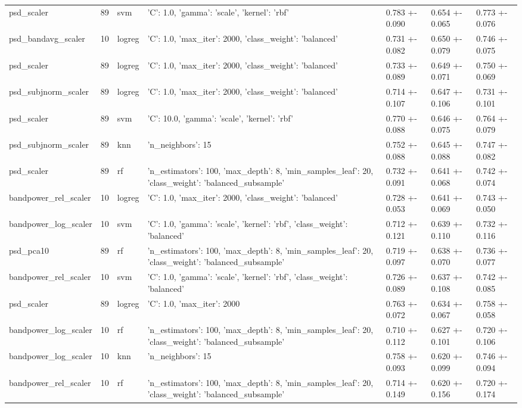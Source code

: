 \begin{longtable}{lrlllll}
psd_scaler & 89 & svm & {'C': 1.0, 'gamma': 'scale', 'kernel': 'rbf'} & 0.783 +- 0.090 & 0.654 +- 0.065 & 0.773 +- 0.076 \\
psd_bandavg_scaler & 10 & logreg & {'C': 1.0, 'max_iter': 2000, 'class_weight': 'balanced'} & 0.731 +- 0.082 & 0.650 +- 0.079 & 0.746 +- 0.075 \\
psd_scaler & 89 & logreg & {'C': 1.0, 'max_iter': 2000, 'class_weight': 'balanced'} & 0.733 +- 0.089 & 0.649 +- 0.071 & 0.750 +- 0.069 \\
psd_subjnorm_scaler & 89 & logreg & {'C': 1.0, 'max_iter': 2000, 'class_weight': 'balanced'} & 0.714 +- 0.107 & 0.647 +- 0.106 & 0.731 +- 0.101 \\
psd_scaler & 89 & svm & {'C': 10.0, 'gamma': 'scale', 'kernel': 'rbf'} & 0.770 +- 0.088 & 0.646 +- 0.075 & 0.764 +- 0.079 \\
psd_subjnorm_scaler & 89 & knn & {'n_neighbors': 15} & 0.752 +- 0.088 & 0.645 +- 0.088 & 0.747 +- 0.082 \\
psd_scaler & 89 & rf & {'n_estimators': 100, 'max_depth': 8, 'min_samples_leaf': 20, 'class_weight': 'balanced_subsample'} & 0.732 +- 0.091 & 0.641 +- 0.068 & 0.742 +- 0.074 \\
bandpower_rel_scaler & 10 & logreg & {'C': 1.0, 'max_iter': 2000, 'class_weight': 'balanced'} & 0.728 +- 0.053 & 0.641 +- 0.069 & 0.743 +- 0.050 \\
bandpower_log_scaler & 10 & svm & {'C': 1.0, 'gamma': 'scale', 'kernel': 'rbf', 'class_weight': 'balanced'} & 0.712 +- 0.121 & 0.639 +- 0.110 & 0.732 +- 0.116 \\
psd_pca10 & 89 & rf & {'n_estimators': 100, 'max_depth': 8, 'min_samples_leaf': 20, 'class_weight': 'balanced_subsample'} & 0.719 +- 0.097 & 0.638 +- 0.070 & 0.736 +- 0.077 \\
bandpower_rel_scaler & 10 & svm & {'C': 1.0, 'gamma': 'scale', 'kernel': 'rbf', 'class_weight': 'balanced'} & 0.726 +- 0.089 & 0.637 +- 0.108 & 0.742 +- 0.085 \\
psd_scaler & 89 & logreg & {'C': 1.0, 'max_iter': 2000} & 0.763 +- 0.072 & 0.634 +- 0.067 & 0.758 +- 0.058 \\
bandpower_log_scaler & 10 & rf & {'n_estimators': 100, 'max_depth': 8, 'min_samples_leaf': 20, 'class_weight': 'balanced_subsample'} & 0.710 +- 0.112 & 0.627 +- 0.101 & 0.720 +- 0.106 \\
bandpower_log_scaler & 10 & knn & {'n_neighbors': 15} & 0.758 +- 0.093 & 0.620 +- 0.099 & 0.746 +- 0.094 \\
bandpower_rel_scaler & 10 & rf & {'n_estimators': 100, 'max_depth': 8, 'min_samples_leaf': 20, 'class_weight': 'balanced_subsample'} & 0.714 +- 0.149 & 0.620 +- 0.156 & 0.720 +- 0.174 \\

\end{longtable}
